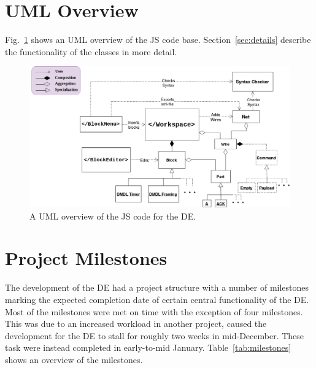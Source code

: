 \documentclass[journal,comsoc]{IEEEtran}
\begin{document}
\section{UML Overview}
Fig.~\ref{fig:uml} shows an UML overview of the JS code base. Section~\ref{sec:details}
describe the functionality of the classes in more detail.
\vspace{2cm}
\label{app:uml}
\begin{figure}[!ht]
\includegraphics[scale=0.5]{dmdl-editor.png}
\center
\caption{A UML overview of the JS code for the DE.}
\label{fig:uml}
\end{figure}

\newpage

\section{Project Milestones}
\label{app:milestones}
The development of the DE had a project structure with a number of milestones marking the
expected completion date of certain central functionality of the DE. Most of the milestones
were met on time with the exception of four milestones. This was due to an increased workload
in another project, caused the development for the DE to stall for roughly two weeks in
mid-December. These task were instead completed in early-to-mid January. Table~\ref{tab:milestones} shows an overview of the milestones.
\end{document}
